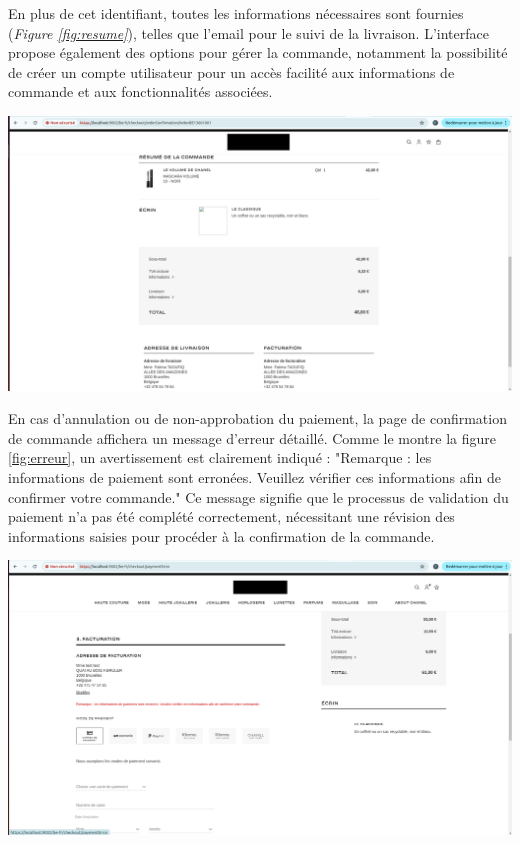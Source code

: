 En plus de cet identifiant, toutes les informations nécessaires sont fournies (\textit{Figure \ref{fig:resume}}), telles que l'email pour le suivi de la livraison. L'interface propose également des options pour gérer la commande, notamment la possibilité de créer un compte utilisateur pour un accès facilité aux informations de commande et aux fonctionnalités associées.
\begin{center}
    \centering
    \includegraphics[width=19cm]{Figures/Screens/resumer commande.png}
    \label{fig:resume}
\end{center}
En cas d'annulation ou de non-approbation du paiement, la page de confirmation de commande affichera un message d'erreur détaillé. Comme le montre la figure \ref{fig:erreur}, un avertissement est clairement indiqué : "Remarque : les informations de paiement sont erronées. Veuillez vérifier ces informations afin de confirmer votre commande." Ce message signifie que le processus de validation du paiement n'a pas été complété correctement, nécessitant une révision des informations saisies pour procéder à la confirmation de la commande.
\begin{center}
    \centering
    \includegraphics[width=19cm]{Figures/Screens/annulation de commande.png}
    \label{fig:erreur}
\end{center}
